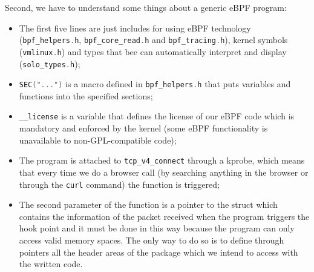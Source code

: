 Second, we have to understand some things about a generic eBPF program:

\begin{itemize}
	\item 
		The first five lines are just includes for using eBPF technology (\colorbox{backcolour}{\lstinline[style=cstyle, language=C]|bpf_helpers.h|}, \colorbox{backcolour}{\lstinline[style=cstyle, language=C]|bpf_core_read.h|} and \colorbox{backcolour}{\lstinline[style=cstyle, language=C]|bpf_tracing.h|}), kernel symbols (\colorbox{backcolour}{\lstinline[style=cstyle, language=C]|vmlinux.h|}) and types that bee can automatically interpret and display (\colorbox{backcolour}{\lstinline[style=cstyle, language=C]|solo_types.h|});
	\item 
		\colorbox{backcolour}{\lstinline[style=cstyle, language=C]|SEC("...")|} is a macro defined in \colorbox{backcolour}{\lstinline[style=cstyle, language=C]|bpf_helpers.h|} that puts variables and functions into the specified sections;
	\item 
		\colorbox{backcolour}{\lstinline[style=cstyle, language=C]|__license|} is a variable that defines the license of our eBPF code which is mandatory and enforced by the kernel (some eBPF functionality is unavailable to non-GPL-compatible code);
	\item 
		The program is attached to \colorbox{backcolour}{\lstinline[style=cstyle, language=C]|tcp_v4_connect|} through a kprobe, which means that every time we do a browser call (by searching anything in the browser or through the \colorbox{backcolour}{\lstinline[style=cstyle, language=C]|curl|} command) the function is triggered;
	\item 
		The second parameter of the function is a pointer to the struct which contains the information of the packet received when the program triggers the hook point and it must be done in this way because the program can only access valid memory spaces. 
		The only way to do so is to define through pointers all the header areas of the package which we intend to access with the written code.
\end{itemize}

